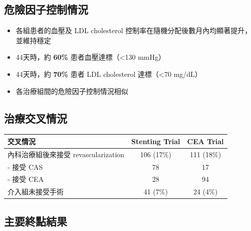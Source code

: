 \documentclass[12pt,a4paper]{article}
\begin{document}
\subsection{危險因子控制情況}

\begin{itemize}
    \item 各組患者的血壓及 LDL cholesterol 控制率在隨機分配後數月內均顯著提升，並維持穩定
    \item 44天時，約 \textbf{60\%} 患者血壓達標（<130 mmHg）
    \item 44天時，約 \textbf{70\%} 患者 LDL cholesterol 達標（<70 mg/dL）
    \item 各治療組間的危險因子控制情況相似
\end{itemize}

\subsection{治療交叉情況}

\begin{longtable}{p{6cm}cc}
\toprule
\textbf{交叉情況} & \textbf{Stenting Trial} & \textbf{CEA Trial} \\
\midrule
\endfirsthead

\bottomrule
\endfoot

內科治療組後來接受 revascularization & 106 (17\%) & 111 (18\%) \\
\quad - 接受 CAS & 78 & 17 \\
\quad - 接受 CEA & 28 & 94 \\
\midrule
介入組未接受手術 & 41 (7\%) & 24 (4\%) \\
\bottomrule
\end{longtable}

\newpage
\subsection{主要終點結果}
\end{document}
